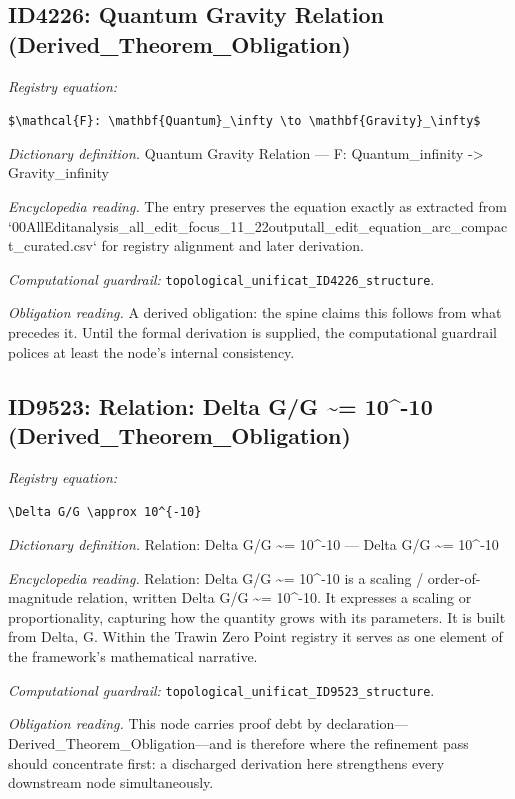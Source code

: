 \documentclass[11pt]{article}
\theoremstyle{remark}
\begin{document}
\subsection{ID4226: Quantum Gravity Relation (Derived\_Theorem\_Obligation)}

\noindent\textit{Registry equation:}\par
{\small\texttt{\$\textbackslash{}mathcal\{F\}: \textbackslash{}mathbf\{Quantum\}\_\textbackslash{}infty \textbackslash{}to \textbackslash{}mathbf\{Gravity\}\_\textbackslash{}infty\$}}\par\medskip
\noindent\textit{Dictionary definition.} Quantum Gravity Relation --- F: Quantum\_infinity -> Gravity\_infinity\par\medskip
\noindent\textit{Encyclopedia reading.} The entry preserves the equation exactly as extracted from `00AllEditanalysis\_all\_edit\_focus\_11\_22outputall\_edit\_equation\_arc\_compact\_curated.csv` for registry alignment and later derivation.
\par\medskip\noindent\textit{Computational guardrail:} \texttt{topological\_unificat\_ID4226\_structure}.
\par\medskip\noindent\textit{Obligation reading.} A derived obligation: the spine claims this follows from what precedes it. Until the formal derivation is supplied, the computational guardrail polices at least the node's internal consistency.

\subsection{ID9523: Relation: Delta G/G \textasciitilde{}= 10\textasciicircum{}-10 (Derived\_Theorem\_Obligation)}

\noindent\textit{Registry equation:}\par
{\small\texttt{\textbackslash{}Delta G/G \textbackslash{}approx 10\textasciicircum{}\{-10\}}}\par\medskip
\noindent\textit{Dictionary definition.} Relation: Delta G/G \textasciitilde{}= 10\textasciicircum{}-10 --- Delta G/G \textasciitilde{}= 10\textasciicircum{}-10\par\medskip
\noindent\textit{Encyclopedia reading.} Relation: Delta G/G \textasciitilde{}= 10\textasciicircum{}-10 is a scaling / order-of-magnitude relation, written Delta G/G \textasciitilde{}= 10\textasciicircum{}-10. It expresses a scaling or proportionality, capturing how the quantity grows with its parameters. It is built from Delta, G. Within the Trawin Zero Point registry it serves as one element of the framework's mathematical narrative.
\par\medskip\noindent\textit{Computational guardrail:} \texttt{topological\_unificat\_ID9523\_structure}.
\par\medskip\noindent\textit{Obligation reading.} This node carries proof debt by declaration---Derived\_Theorem\_Obligation---and is therefore where the refinement pass should concentrate first: a discharged derivation here strengthens every downstream node simultaneously.
\end{document}
